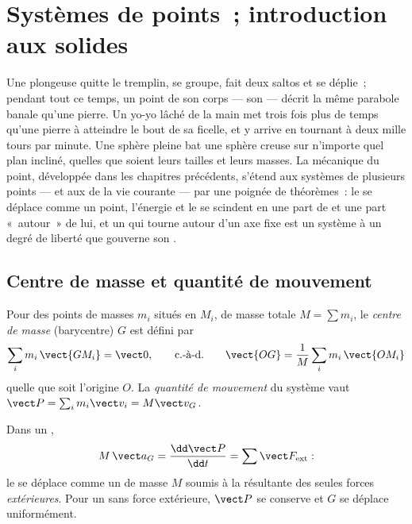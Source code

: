 \chapter{Systèmes de points~; introduction aux solides}\label{ch:b1:systems-of-points}

Une plongeuse quitte le tremplin, se groupe, fait deux saltos et se
déplie~; pendant tout ce temps, un point de son corps --- son  --- décrit la même parabole banale qu'une pierre. Un yo-yo lâché
de la main met trois fois plus de temps qu'une pierre à atteindre le
bout de sa ficelle, et y arrive en tournant à deux mille tours par
minute. Une sphère pleine bat une sphère creuse sur n'importe quel plan
incliné, quelles que soient leurs tailles et leurs masses. La mécanique
du point, développée dans les chapitres précédents, s'étend aux systèmes
de plusieurs points --- et aux  de la vie courante --- par une
poignée de théorèmes~: le  se déplace comme un point,
l'énergie et le  se scindent en une part de  et une part «~autour~» de lui, et un  qui tourne autour d'un
axe fixe est un système à un degré de liberté que gouverne son .

\section{Centre de masse et quantité de mouvement}

\begin{definition}\label{def:b1:systems-of-points:cm}
Pour des points de masses $m_i$ situés en $M_i$, de masse totale
$M = \sum m_i$, le \emph{centre de masse} (barycentre) $G$ est défini par
\[
\sum_i m_i\,\vect{GM_i} = \vect 0, \qquad\text{c.-à-d.}\qquad
\vect{OG} = \frac{1}{M}\sum_i m_i\,\vect{OM_i}
\]
quelle que soit l'origine $O$. La \emph{quantité de mouvement} du
système vaut $\vect P =
\sum_i m_i\vect v_i = M\vect v_G$.
\end{definition}

\begin{theorem}\label{thm:b1:systems-of-points:cmtheorem}
Dans un ,
\[
M\,\vect a_G = \frac{\dd\vect P}{\dd t} = \sum\vect F_{\mathrm{ext}} :
\]
le  se déplace comme un  de masse $M$
soumis à la résultante des seules forces \emph{extérieures}. Pour un
 sans force extérieure, $\vect P$ se conserve et $G$ se
déplace uniformément.
\end{theorem}

